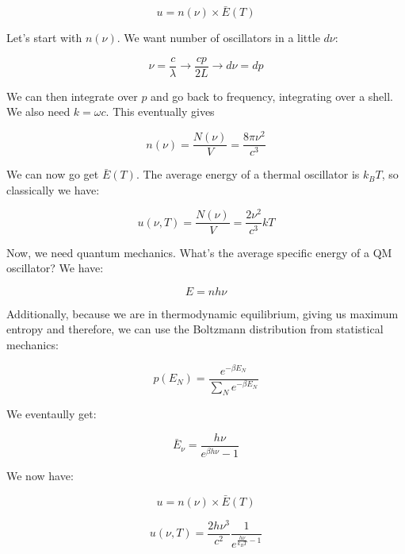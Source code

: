 \documentclass{article}
\begin{document}
\begin{equation}
    u = n(\nu) \times \bar{E}(T)
\end{equation}

Let's start with $n(\nu)$. We want number of oscillators in a little $d\nu$:

\begin{equation}
    \nu = \frac{c}{\lambda} \rightarrow \frac{cp}{2L} \rightarrow d\nu = dp 
\end{equation}

We can then integrate over $p$ and go back to frequency, integrating over a shell. We also need $k = \omega c$. This eventually gives

\begin{equation}
    n(\nu) = \frac{N(\nu)}{V} =  \frac{8 \pi \nu^2}{c^3}
\end{equation}

We can now go get $\bar{E}(T)$. The average energy of a thermal oscillator is $k_B T$, so classically we have:


\begin{equation}
    u(\nu, T) = \frac{N(\nu)}{V} =  \frac{2 \nu^2}{c^3} kT
\end{equation}

Now, we need quantum mechanics. What's the average specific energy of a QM oscillator? We have:

\begin{equation}
    E = nh\nu
\end{equation}

Additionally, because we are in thermodynamic equilibrium, giving us maximum entropy and therefore, we can use the Boltzmann distribution from statistical mechanics:

\begin{equation}
    p(E_N) = \frac{e^{-\beta E_N}}{\sum_N e^{-\beta E_N}}
\end{equation}

We eventaully get:

\begin{equation}
    \bar{E}_\nu = \frac{h \nu}{e^{\beta h \nu} -1}
\end{equation}

We now have:

\begin{equation}
    u = n(\nu) \times \bar{E}(T)
\end{equation}

\begin{equation}
    \boxed{u(\nu, T) = \frac{2 h \nu^3}{c^2} \frac{1}{e^{\frac{h\nu}{k_B T} - 1}}}
\end{equation}
\end{document}

